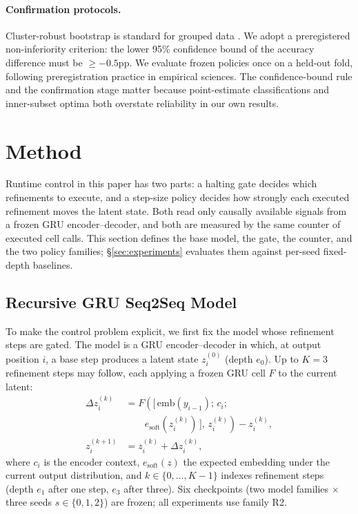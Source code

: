 \documentclass[11pt]{article}
\begin{document}
\paragraph{Confirmation protocols.}
Cluster-robust bootstrap is standard for grouped data \citep{cameron2015practitioner}. We adopt a preregistered non-inferiority criterion: the lower 95\% confidence bound of the accuracy difference must be $\geq -0.5$pp. We evaluate frozen policies once on a held-out fold, following preregistration practice in empirical sciences. The confidence-bound rule and the confirmation stage matter because point-estimate classifications and inner-subset optima both overstate reliability in our own results.

\section{Method}
\label{sec:method}

Runtime control in this paper has two parts: a halting gate decides which refinements to execute, and a step-size policy decides how strongly each executed refinement moves the latent state. Both read only causally available signals from a frozen GRU encoder--decoder, and both are measured by the same counter of executed cell calls. This section defines the base model, the gate, the counter, and the two policy families; \S\ref{sec:experiments} evaluates them against per-seed fixed-depth baselines.

\subsection{Recursive GRU Seq2Seq Model}
\label{sec:model}
To make the control problem explicit, we first fix the model whose refinement steps are gated. The model is a GRU encoder--decoder \citep{cho2014gru,sutskever2014seq2seq} in which, at output position $i$, a base step produces a latent state $z_i^{(0)}$ (depth $e_0$). Up to $K{=}3$ refinement steps may follow, each applying a frozen GRU cell $F$ to the current latent:
\begin{equation}
\begin{aligned}
\Delta z_i^{(k)} &= F\!\left(\big[\,\mathrm{emb}(y_{i-1});\,c_i;\right.\\
 &\qquad\left. e_{\mathrm{soft}}(z_i^{(k)})\,\big],\, z_i^{(k)}\right)-z_i^{(k)},\\
z_i^{(k+1)} &= z_i^{(k)} + \Delta z_i^{(k)},
\end{aligned}
\label{eq:refine}
\end{equation}
where $c_i$ is the encoder context, $e_{\mathrm{soft}}(z)$ the expected embedding under the current output distribution, and $k \in \{0,\dots,K{-}1\}$ indexes refinement steps (depth $e_1$ after one step, $e_3$ after three). Six checkpoints (two model families $\times$ three seeds $s \in \{0,1,2\}$) are frozen; all experiments use family R2.
\end{document}
